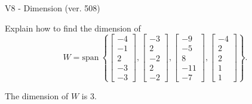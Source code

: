 \begin{exercise}
  \begin{exerciseTitle}V8 - Dimension (ver. 508)\end{exerciseTitle}
  \begin{exerciseStatement}
    Explain how to find the dimension of 
\[W=\mathrm{span}\ \left\{\left[\begin{array}{r}
-4 \\
-1 \\
2 \\
-3 \\
-3
\end{array}\right] , \left[\begin{array}{r}
-3 \\
2 \\
-2 \\
2 \\
-2
\end{array}\right] , \left[\begin{array}{r}
-9 \\
-5 \\
8 \\
-11 \\
-7
\end{array}\right] , \left[\begin{array}{r}
-4 \\
2 \\
2 \\
1 \\
1
\end{array}\right]\right\}.\]



  \end{exerciseStatement}
  \begin{exerciseAnswer}
   The dimension of \(W\) is  \(3\).
  


  \end{exerciseAnswer}
\end{exercise}